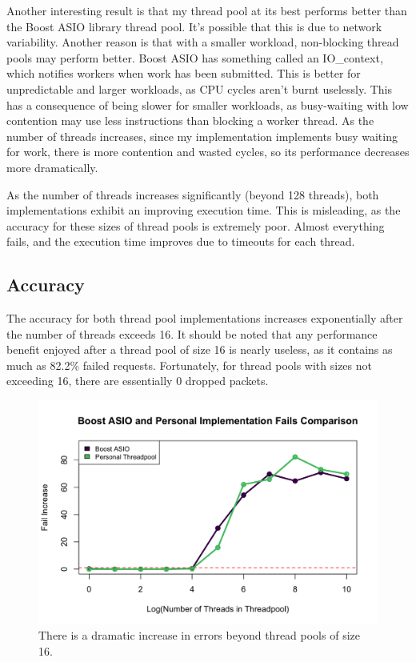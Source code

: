 \documentclass[12pt]{article}
\begin{document}
    Another interesting result is that my thread pool at its best performs better than the Boost ASIO library thread pool. It's possible that this is due to network variability. Another reason is that with a smaller workload, non-blocking thread pools may perform better. Boost ASIO has something called an IO\_context, which notifies workers when work has been submitted. This is better for unpredictable and larger workloads, as CPU cycles aren't burnt uselessly. This has a consequence of being slower for smaller workloads, as busy-waiting with low contention may use less instructions than blocking a worker thread. As the number of threads increases, since my implementation implements busy waiting for work, there is more contention and wasted cycles, so its performance decreases more dramatically. 

    As the number of threads increases significantly (beyond 128 threads), both implementations exhibit an improving execution time. This is misleading, as the accuracy for these sizes of thread pools is extremely poor. Almost everything fails, and the execution time improves due to timeouts for each thread. 
\subsection{Accuracy}
    
   The accuracy for both thread pool implementations increases exponentially after the number of threads exceeds 16. It should be noted that any performance benefit enjoyed after a thread pool of size 16 is nearly useless, as it contains as much as 82.2\% failed requests. Fortunately, for thread pools with sizes not exceeding 16, there are essentially 0 dropped packets.

   
    \begin{figure}[H]
        \centering
        \includegraphics[width = 1.0\linewidth]{failComp.png}
        \caption{There is a dramatic increase in errors beyond thread pools of size 16.}
    \end{figure}
\end{document}
